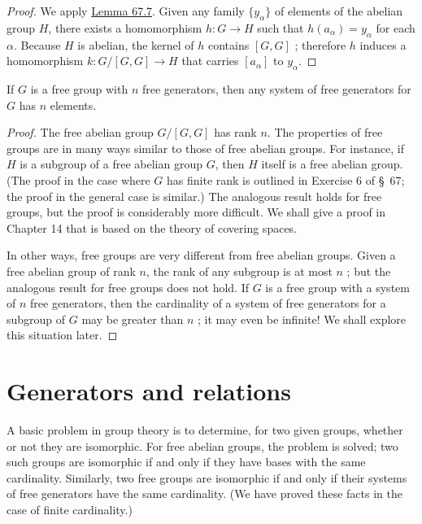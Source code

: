 \begin{proof}
We apply \hyperref[lem:67.7]{Lemma 67.7}. Given any family \(\{ y_{\alpha }\}\) of elements of the abelian group \(H\), there exists a homomorphism \(h : G \rightarrow H\) such that \(h( a_{\alpha }) = y_{\alpha }\) for each \(\alpha\). Because \(H\) is abelian, the kernel of \(h\) contains \([ {G,G}]\) ; therefore \(h\) induces a homomorphism \(k : G/[ {G,G}] \rightarrow H\) that carries \([ a_{\alpha }]\) to \(y_{\alpha }\).
\end{proof}
\begin{corollary}
\label{cor:\thetheorem}
If \(G\) is a free group with \(n\) free generators, then any system of free generators for \(G\) has \(n\) elements.
\end{corollary}

\begin{proof}
The free abelian group \(G/[ {G,G}]\) has rank \(n\).
The properties of free groups are in many ways similar to those of free abelian groups. For instance, if \(H\) is a subgroup of a free abelian group \(G\), then \(H\) itself is a free abelian group. (The proof in the case where \(G\) has finite rank is outlined in Exercise 6 of \S\ 67; the proof in the general case is similar.) The analogous result holds for free groups, but the proof is considerably more difficult. We shall give a proof in Chapter 14 that is based on the theory of covering spaces.

In other ways, free groups are very different from free abelian groups. Given a free abelian group of rank \(n\), the rank of any subgroup is at most \(n\) ; but the analogous result for free groups does not hold. If \(G\) is a free group with a system of \(n\) free generators, then the cardinality of a system of free generators for a subgroup of \(G\) may be greater than \(n\) ; it may even be infinite! We shall explore this situation later.
\end{proof}
\section*{Generators and relations}

A basic problem in group theory is to determine, for two given groups, whether or not they are isomorphic. For free abelian groups, the problem is solved; two such groups are isomorphic if and only if they have bases with the same cardinality. Similarly, two free groups are isomorphic if and only if their systems of free generators have the same cardinality. (We have proved these facts in the case of finite cardinality.)

